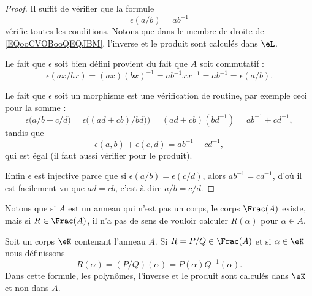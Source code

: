 \begin{proof}
    Il suffit de vérifier que la formule
    \begin{equation}        \label{EQooCVOBooQEQJBM}
        \epsilon(a/b)=ab^{-1}
    \end{equation}
    vérifie toutes les conditions. Notons que dans le membre de droite de \eqref{EQooCVOBooQEQJBM}, l'inverse et le produit sont calculés dans \( \eL\).

    Le fait que \( \epsilon\) soit bien défini provient du fait que \( A\) soit commutatif :
    \begin{equation}
        \epsilon(ax/bx)=(ax)(bx)^{-1}=ab^{-1}xx^{-1}=ab^{-1}=\epsilon(a/b).
    \end{equation}

    Le fait que \( \epsilon\) soit un morphisme est une vérification de routine, par exemple ceci pour la somme :
    \begin{equation}
        \epsilon\big( a/b+c/d \big)=\epsilon\big( (ad+cb)/bd)\big)=(ad+cb)(bd^{-1})=ab^{-1}+cd^{-1},
    \end{equation}
    tandis que
    \begin{equation}
        \epsilon(a,b)+\epsilon(c,d)=ab^{-1}+cd^{-1},
    \end{equation}
    qui est égal (il faut aussi vérifier pour le produit).

    Enfin \( \epsilon\) est injective parce que si \( \epsilon(a/b)=\epsilon(c/d)\), alors \( ab^{-1}=cd^{-1}\), d'où il est facilement vu que \( ad=cb\), c'est-à-dire \( a/b=c/d\).
\end{proof}

Notons que si \( A\) est un anneau qui n'est pas un corps, le corps \( \Frac(A)\) existe, mais si \( R\in\Frac(A)\), il n'a pas de sens de vouloir calculer \( R(\alpha)\) pour \( \alpha\in A\).

\begin{definition}       \label{DEFooLBIWooCPCaSY}
    Soit un corps \( \eK\) contenant l'anneau \( A\). Si \( R=P/Q\in \Frac(A)\) et si \( \alpha\in \eK\) nous définissons
    \begin{equation}
        R(\alpha)=(P/Q)(\alpha)=P(\alpha)Q^{-1}(\alpha).
    \end{equation}
    Dans cette formule, les polynômes, l'inverse et le produit sont calculés dans \( \eK\) et non dans \( A\).
\end{definition}

